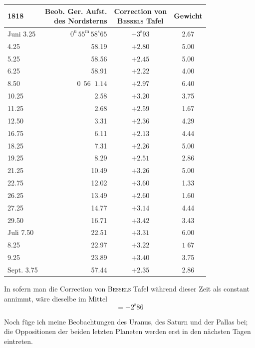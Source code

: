\begin{center}
\begin{tabular}{l|r|c|c}
1818 & \shortstack{Beob. Ger. Aufst.\\des Nordsterns} & \shortstack{Correction von\\\textsc{Bessels} Tafel} & Gewicht \\
\hline
Juni 3.25 & $0^{\mathrm u}\,55^{\mathrm m}\,58^{\mathrm s}65$ & $+3^{\mathrm s}93$ & 2.67 \\
4.25 & 58.19 & $+2.80$ & 5.00 \\
5.25 & 58.56 & $+2.45$ & 5.00 \\
6.25 & 58.91 & $+2.22$ & 4.00 \\
8.50 & $0\,\;56\;\;1.14$ & $+2.97$ & 6.40 \\
10.25 & 2.58 & $+3.20$ & 3.75 \\
11.25 & 2.68 & $+2.59$ & 1.67 \\
12.50 & 3.31 & $+2.36$ & 4.29 \\
16.75 & 6.11 & $+2.13$ & 4.44 \\
18.25 & 7.31 & $+2.26$ & 5.00 \\
19.25 & 8.29 & $+2.51$ & 2.86 \\
21.25 & 10.49 & $+3.26$ & 5.00 \\
22.75 & 12.02 & $+3.60$ & 1.33 \\
26.25 & 13.49 & $+2.60$ & 1.60 \\
27.25 & 14.77 & $+3.14$ & 4.44 \\
29.50 & 16.71 & $+3.42$ & 3.43 \\
Juli 7.50 & 22.51 & $+3.31$ & 6.00 \\
8.25 & 22.97 & $+3.22$ & $1\;67$ \\
9.25 & 23.89 & $+3.40$ & 3.75 \\
Sept. 3.75 & 57.44 & $+2.35$ & 2.86 \\
\end{tabular}
\end{center}

\par\indent In sofern man die Correction von \textsc{Bessels} Tafel während dieser Zeit als constant annimmt, wäre dieselbe im Mittel
\[
= +2^{\mathrm s}86
\]

\par\indent Noch füge ich meine Beobachtungen des Uranus, des Saturn und der Pallas bei; die Oppositionen der beiden letzten Planeten werden erst in den nächsten Tagen eintreten.

